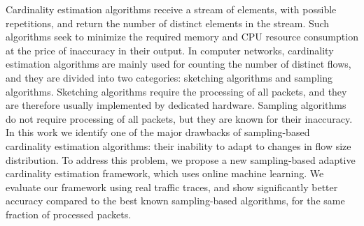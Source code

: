 Cardinality estimation algorithms receive a stream of elements, with possible repetitions, and return the number of distinct elements in the stream. Such algorithms seek to minimize the required memory and CPU resource consumption at the price of inaccuracy in their output.  In computer networks, cardinality estimation algorithms are mainly used for counting the number of distinct flows, and they are divided into two categories: sketching algorithms and sampling algorithms. Sketching algorithms require the processing of all packets, and they are therefore usually implemented by dedicated hardware. Sampling algorithms do not require processing of all packets, but they are known for their inaccuracy. In this work we identify one of the major drawbacks of sampling-based cardinality estimation algorithms: their inability to adapt to changes in flow size distribution. To address this problem, we propose a new sampling-based adaptive cardinality estimation framework, which uses online machine learning. We evaluate our framework using real traffic traces, and show significantly better accuracy compared to the best known sampling-based algorithms, for the same fraction of processed packets.